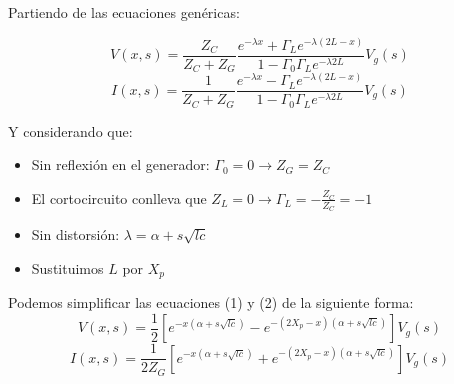 \documentclass[12pt]{article}
\begin{document}
Partiendo de las ecuaciones genéricas:

\begin{equation}
V(x,s)= \frac{{Z}_{C}}{{Z}_{C} + {Z}_{G}} \frac{{e}^{-\lambda x}+{\Gamma}_{L}{e}^{-\lambda (2L-x)}}{1-{\Gamma}_{0}{\Gamma}_{L}{e}^{-\lambda 2L}}{V}_{g}(s)
\end{equation}
\begin{equation}
I(x,s)= \frac{1}{{Z}_{C} + {Z}_{G}} \frac{{e}^{-\lambda x}-{\Gamma}_{L}{e}^{-\lambda (2L-x)}}{1-{\Gamma}_{0}{\Gamma}_{L}{e}^{-\lambda 2L}}{V}_{g}(s)
\end{equation}

Y considerando que:
\begin{itemize}
	\item Sin reflexión en el generador: ${\Gamma}_{0} = 0 \rightarrow {Z}_{G}={Z}_{C}$
	\item El cortocircuito conlleva que ${Z}_{L} = 0 \rightarrow {\Gamma}_{L}=-\frac{{Z}_{C}}{{Z}_{C}}=-1$
	\item Sin distorsión: $\lambda=\alpha+s\sqrt{lc}$
	\item Sustituimos $L$ por ${X}_{p}$
\end{itemize}
Podemos simplificar las ecuaciones (1) y (2) de la siguiente forma:
\begin{equation}
V(x,s)= \frac{1}{2}[{e}^{-x(\alpha + s\sqrt{lc})} - {e}^{-(2{X}_{p}-x)(\alpha + s\sqrt{lc})}]{V}_{g}(s)
\end{equation}
\begin{equation}
I(x,s)= \frac{1}{2{Z}_{G}}[{e}^{-x(\alpha + s\sqrt{lc})} + {e}^{-(2{X}_{p}-x)(\alpha + s\sqrt{lc})}]{V}_{g}(s)
\end{equation}
\end{document}

